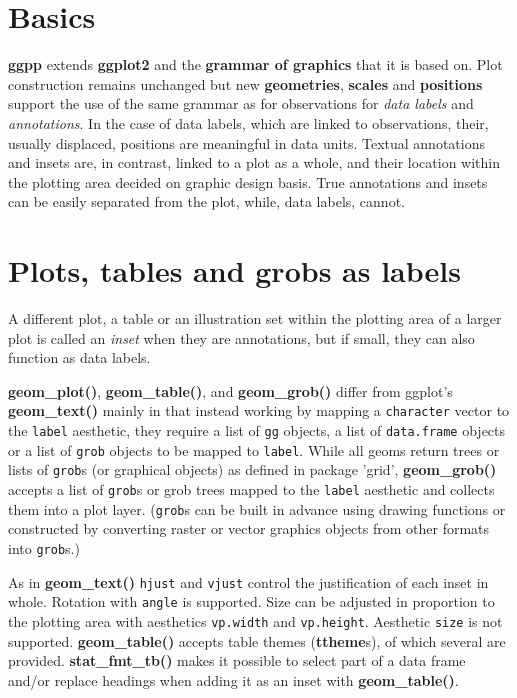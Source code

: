 \documentclass[DIV=25,a3,landscape,9pt]{scrartcl}\usepackage[]{graphicx}\usepackage[]{xcolor}
\begin{document}
\begin{multicols}{3}

\section*{Basics}

\textbf{ggpp} extends \textbf{ggplot2} and the \textbf{grammar of graphics} that it is based on. Plot construction remains unchanged but new \textbf{geometries}, \textbf{scales} and \textbf{positions} support the use of the same grammar as for observations for \emph{data labels} and \emph{annotations}. In the case of data labels, which are linked to observations, their, usually displaced, positions are meaningful in data units. Textual annotations and insets are, in contrast, linked to a plot as a whole, and their location within the plotting area decided on graphic design basis. True annotations and insets can be easily separated from the plot, while, data labels, cannot.



\section*{Plots, tables and grobs as labels}

A different plot, a table or an illustration set within the plotting area of a larger plot is called an \textsl{inset} when they are annotations, but if small, they can also function as data labels.

\textbf{geom\_plot()}, \textbf{geom\_table()}, and \textbf{geom\_grob()} differ from ggplot's \textbf{geom\_text()} mainly in that instead working by mapping a \texttt{character} vector to the \texttt{label} aesthetic, they require a list of \texttt{gg} objects, a list of \texttt{data.frame} objects or a list of \texttt{grob} objects to be mapped to \texttt{label}. While all geoms return trees or lists of \texttt{grob}s (or graphical objects) as defined in package 'grid', \textbf{geom\_grob()} accepts a list of \texttt{grob}s or grob trees mapped to the \texttt{label} aesthetic and collects them into a plot layer. (\texttt{grob}s can be built in advance using drawing functions or constructed by converting raster or vector graphics objects from other formats into \texttt{grob}s.)

As in \textbf{geom\_text()} \texttt{hjust} and \texttt{vjust} control the justification of each inset in whole. Rotation with \texttt{angle} is supported. Size can be adjusted in proportion to the plotting area with aesthetics \texttt{vp.width} and \texttt{vp.height}. Aesthetic \texttt{size} is not supported. \textbf{geom\_table()} accepts table themes (\textbf{ttheme}s), of which several are provided. \textbf{stat\_fmt\_tb()} makes it possible to select part of a data frame and/or replace headings when adding it as an inset with \textbf{geom\_table()}.\vspace{1ex}


\end{multicols}
\end{document}
